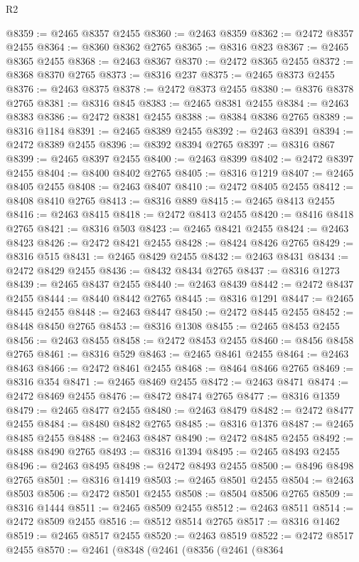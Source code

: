 \begin{lexlean}{R2}
\begin{coremodule}
@8359 := @2465 @8357 @2455
@8360 := @2463 @8359
@8362 := @2472 @8357 @2455
@8364 := @8360 @8362 @2765
@8365 := @8316 @823
@8367 := @2465 @8365 @2455
@8368 := @2463 @8367
@8370 := @2472 @8365 @2455
@8372 := @8368 @8370 @2765
@8373 := @8316 @237
@8375 := @2465 @8373 @2455
@8376 := @2463 @8375
@8378 := @2472 @8373 @2455
@8380 := @8376 @8378 @2765
@8381 := @8316 @845
@8383 := @2465 @8381 @2455
@8384 := @2463 @8383
@8386 := @2472 @8381 @2455
@8388 := @8384 @8386 @2765
@8389 := @8316 @1184
@8391 := @2465 @8389 @2455
@8392 := @2463 @8391
@8394 := @2472 @8389 @2455
@8396 := @8392 @8394 @2765
@8397 := @8316 @867
@8399 := @2465 @8397 @2455
@8400 := @2463 @8399
@8402 := @2472 @8397 @2455
@8404 := @8400 @8402 @2765
@8405 := @8316 @1219
@8407 := @2465 @8405 @2455
@8408 := @2463 @8407
@8410 := @2472 @8405 @2455
@8412 := @8408 @8410 @2765
@8413 := @8316 @889
@8415 := @2465 @8413 @2455
@8416 := @2463 @8415
@8418 := @2472 @8413 @2455
@8420 := @8416 @8418 @2765
@8421 := @8316 @503
@8423 := @2465 @8421 @2455
@8424 := @2463 @8423
@8426 := @2472 @8421 @2455
@8428 := @8424 @8426 @2765
@8429 := @8316 @515
@8431 := @2465 @8429 @2455
@8432 := @2463 @8431
@8434 := @2472 @8429 @2455
@8436 := @8432 @8434 @2765
@8437 := @8316 @1273
@8439 := @2465 @8437 @2455
@8440 := @2463 @8439
@8442 := @2472 @8437 @2455
@8444 := @8440 @8442 @2765
@8445 := @8316 @1291
@8447 := @2465 @8445 @2455
@8448 := @2463 @8447
@8450 := @2472 @8445 @2455
@8452 := @8448 @8450 @2765
@8453 := @8316 @1308
@8455 := @2465 @8453 @2455
@8456 := @2463 @8455
@8458 := @2472 @8453 @2455
@8460 := @8456 @8458 @2765
@8461 := @8316 @529
@8463 := @2465 @8461 @2455
@8464 := @2463 @8463
@8466 := @2472 @8461 @2455
@8468 := @8464 @8466 @2765
@8469 := @8316 @354
@8471 := @2465 @8469 @2455
@8472 := @2463 @8471
@8474 := @2472 @8469 @2455
@8476 := @8472 @8474 @2765
@8477 := @8316 @1359
@8479 := @2465 @8477 @2455
@8480 := @2463 @8479
@8482 := @2472 @8477 @2455
@8484 := @8480 @8482 @2765
@8485 := @8316 @1376
@8487 := @2465 @8485 @2455
@8488 := @2463 @8487
@8490 := @2472 @8485 @2455
@8492 := @8488 @8490 @2765
@8493 := @8316 @1394
@8495 := @2465 @8493 @2455
@8496 := @2463 @8495
@8498 := @2472 @8493 @2455
@8500 := @8496 @8498 @2765
@8501 := @8316 @1419
@8503 := @2465 @8501 @2455
@8504 := @2463 @8503
@8506 := @2472 @8501 @2455
@8508 := @8504 @8506 @2765
@8509 := @8316 @1444
@8511 := @2465 @8509 @2455
@8512 := @2463 @8511
@8514 := @2472 @8509 @2455
@8516 := @8512 @8514 @2765
@8517 := @8316 @1462
@8519 := @2465 @8517 @2455
@8520 := @2463 @8519
@8522 := @2472 @8517 @2455
@8570 := @2461
    (@8348
      (@2461
        (@8356
          (@2461
            (@8364

\end{coremodule}
\end{lexlean}
